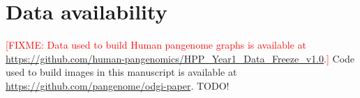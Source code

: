 \documentclass{bioinfo}
\newcommand{\red}[1]{{\textcolor{Red}{#1}}}
\newcommand{\FIXME}[1]{\red{[FIXME: #1]}}
\begin{document}
\section*{Data availability}

\FIXME{Data used to build Human pangenome graphs is available at \url{https://github.com/human-pangenomics/HPP_Year1_Data_Freeze_v1.0}.}
Code used to build images in this manuscript is available at \url{https://github.com/pangenome/odgi-paper}.
TODO!



%
%
%
%
%
%
%











\end{document}
